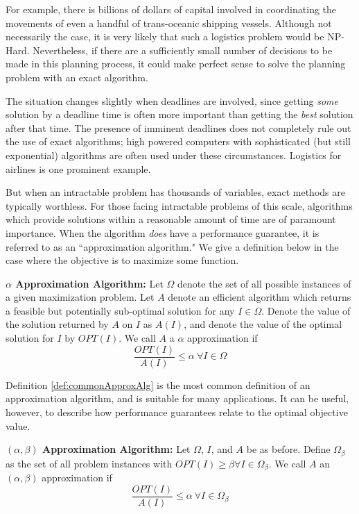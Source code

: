 \documentclass[12pt]{article}
\begin{document}
For example, there is billions of dollars of capital involved in coordinating the movements of even a handful of trans-oceanic shipping vessels. 
Although not necessarily the case, it is very likely that such a logistics problem would be NP-Hard.
Nevertheless, if there are a sufficiently small number of decisions to be made in this planning process, it could make perfect sense to solve the planning problem with an exact algorithm.

The situation changes slightly when deadlines are involved, since getting \textit{some} solution by a deadline time is often more important than getting the \textit{best} solution after that time. 
The presence of imminent deadlines does not completely rule out the use of exact algorithms; high powered computers with sophisticated (but still exponential) algorithms are often used under these circumstances. 
Logistics for airlines is one prominent example.

But when an intractable problem has thousands of variables, exact methods are typically worthless. 
For those facing intractable problems of this scale, algorithms which provide solutions within a reasonable amount of time are of paramount importance.  
When the algorithm \textit{does} have a performance guarantee, it is referred to as an ``approximation algorithm."
We give a definition below in the case where the objective is to maximize some function. 

\begin{definition}
\textbf{$\alpha$ Approximation Algorithm: } Let $\Omega$ denote the set of all possible instances of a given maximization problem. 
Let $A$ denote an efficient algorithm which returns a feasible but potentially sub-optimal solution for any $I \in \Omega$. 
Denote the value of the solution returned by $A$ on $I$ as $A(I)$, and denote the value of the optimal solution for $I$ by $OPT(I)$. We call $A$ a $\alpha$ approximation if
\begin{equation*}
\frac{OPT(I)}{A(I)} \leq \alpha ~ \forall I \in \Omega
\end{equation*}
\label{def:commonApproxAlg}
\end{definition}

Definition \ref{def:commonApproxAlg} is the most common definition of an approximation algorithm, and is suitable for many applications. It can be useful, however, to describe how performance guarantees relate to the optimal objective value. 
\begin{definition}
\textbf{$(\alpha,\beta)$  Approximation Algorithm: } Let $\Omega$, $I$, and $A$ be as before. 
Define $\Omega_\beta$ as the set of all problem instances with $OPT(I) \geq \beta \forall I \in \Omega_\beta$.
We call $A$ an $(\alpha,\beta)$ approximation if 
\begin{equation*}
\frac{OPT(I)}{A(I)} \leq \alpha ~ \forall I \in \Omega_{\beta}
\end{equation*}
\label{def:twoParamApproxAlg}
\end{definition}
\end{document}
